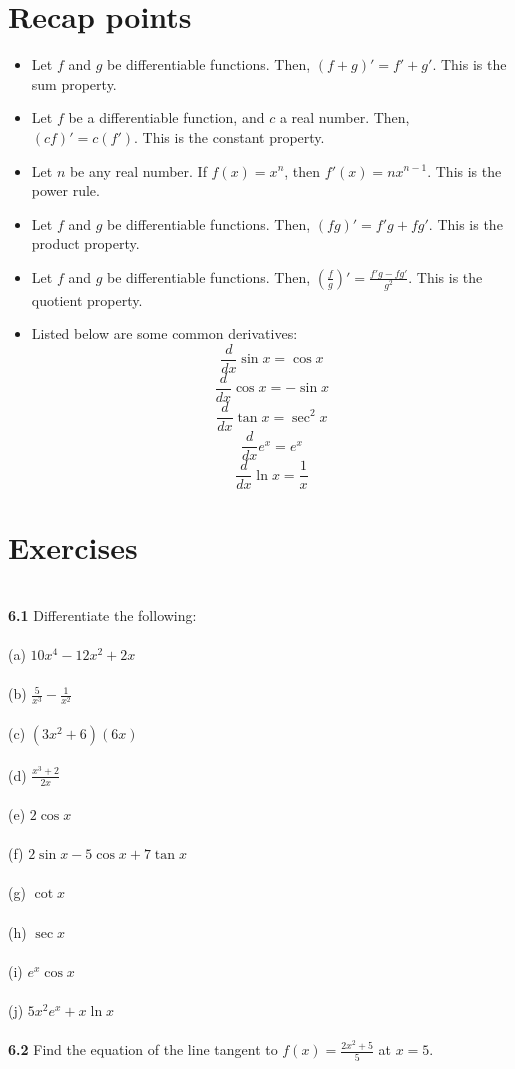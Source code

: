\documentclass[11pt]{scrartcl}
\begin{document}
\section{Recap points}
\begin{itemize}
    \item Let $f$ and $g$ be differentiable functions. Then, $(f+g)'=f'+g'$. This is the sum property. 
    \item Let $f$ be a differentiable function, and $c$ a real number. Then,  $(cf)'=c(f')$. This is the constant property. 
    \item Let $n$ be any real number. If $f(x)=x^n$, then $f'(x)=nx^{n-1}$. This is the power rule. 
    \item Let $f$ and $g$ be differentiable functions. Then, $(fg)'=f'g+fg'$. This is the product property. 
    \item Let $f$ and $g$ be differentiable functions. Then,  $\left(\frac{f}{g}\right)'=\frac{f'g-fg'}{g^2}$. This is the quotient property. 
    \item Listed below are some common derivatives: 
    $$\frac{d}{dx}\sin x=\cos x$$
    $$\frac{d}{dx}\cos x=-\sin x$$
    $$\frac{d}{dx}\tan x=\sec ^2 x$$
    $$\frac{d}{dx}e^x=e^x$$
    $$\frac{d}{dx} \ln x=\frac{1}{x}$$
\end{itemize}
\section{Exercises}\\
\noindent
\textbf{6.1} Differentiate the following:\\
\noindent\\
(a) $10x^4-12x^2+2x$\\
\noindent\\
(b) $\frac{5}{x^3}-\frac{1}{x^2}$\\
\noindent\\
(c) $(3x^2+6)(6x)$\\
\noindent\\
(d) $\frac{x^3+2}{2x}$\\
\noindent\\
(e) $2\cos x$\\
\noindent\\
(f) $2\sin x-5\cos x+7\tan x$\\
\noindent\\
(g) $\cot x$\\
\noindent\\
(h) $\sec x$\\
\noindent\\
(i) $e^x \cos x$ \\
\\
\noindent 
(j) $5x^2e^x+x\ln x$\\
\\
\noindent 
\textbf{6.2} Find the equation of the line tangent to $f(x)=\frac{2x^2+5}{5}$ at $x=5$.
\end{document}
